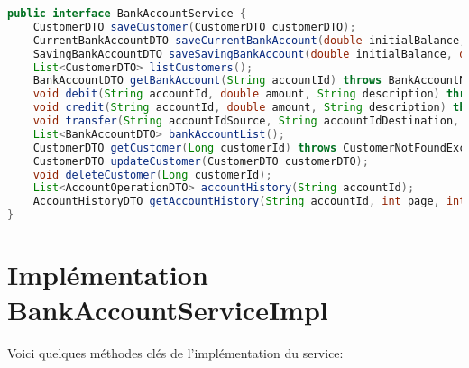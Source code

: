 \documentclass[12pt,a4paper]{report}
\begin{document}
\begin{lstlisting}[language=Java, caption=BankAccountService.java]
public interface BankAccountService {
    CustomerDTO saveCustomer(CustomerDTO customerDTO);
    CurrentBankAccountDTO saveCurrentBankAccount(double initialBalance, double overDraft, Long customerId) throws CustomerNotFoundException;
    SavingBankAccountDTO saveSavingBankAccount(double initialBalance, double interestRate, Long customerId) throws CustomerNotFoundException;
    List<CustomerDTO> listCustomers();
    BankAccountDTO getBankAccount(String accountId) throws BankAccountNotFoundException;
    void debit(String accountId, double amount, String description) throws BankAccountNotFoundException, BalanceNotSufficientException;
    void credit(String accountId, double amount, String description) throws BankAccountNotFoundException;
    void transfer(String accountIdSource, String accountIdDestination, double amount) throws BankAccountNotFoundException, BalanceNotSufficientException;
    List<BankAccountDTO> bankAccountList();
    CustomerDTO getCustomer(Long customerId) throws CustomerNotFoundException;
    CustomerDTO updateCustomer(CustomerDTO customerDTO);
    void deleteCustomer(Long customerId);
    List<AccountOperationDTO> accountHistory(String accountId);
    AccountHistoryDTO getAccountHistory(String accountId, int page, int size) throws BankAccountNotFoundException;
}
\end{lstlisting}

\section{Implémentation BankAccountServiceImpl}
Voici quelques méthodes clés de l'implémentation du service:
\end{document}
